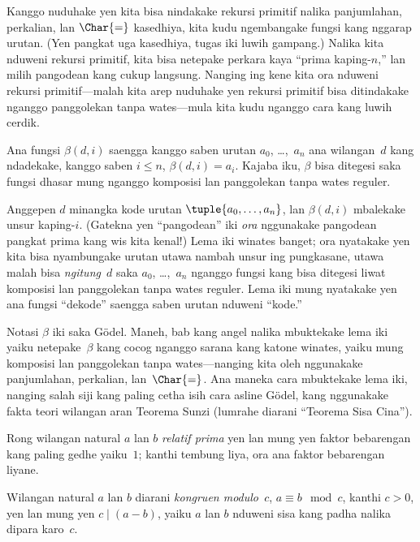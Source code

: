 \documentclass[../../../include/open-logic-section]{subfiles}
\begin{document}


Kanggo nuduhake yen kita bisa nindakake rekursi primitif nalika
panjumlahan, perkalian, lan $\Char{=}$ kasedhiya, kita kudu
ngembangake fungsi kang nggarap urutan. (Yen pangkat uga
kasedhiya, tugas iki luwih gampang.) Nalika kita nduweni rekursi
primitif, kita bisa netepake perkara kaya ``prima kaping-$n$,'' lan
milih pangodean kang cukup langsung. Nanging ing kene kita ora
nduweni rekursi primitif---malah kita arep nuduhake yen rekursi
primitif bisa ditindakake nganggo panggolekan tanpa wates---mula kita kudu
nganggo cara kang luwih cerdik.

\begin{lem}
Ana fungsi $\beta(d,i)$ saengga kanggo saben urutan $a_0$,
\dots,~$a_n$ ana wilangan~$d$ kang ndadekake, kanggo saben $i \le n$,
$\beta(d,i) = a_i$. Kajaba iku, $\beta$ bisa ditegesi saka fungsi
dhasar mung nganggo komposisi lan panggolekan tanpa wates reguler.
\end{lem}

Anggepen $d$ minangka kode urutan $\tuple{a_0, \dots, a_n}$, lan
$\beta(d,i)$ mbalekake unsur kaping-$i$. (Gatekna yen ``pangodean'' iki
\emph{ora} nggunakake pangodean pangkat prima kang wis kita kenal!)
Lema iki winates banget; ora nyatakake yen kita bisa nyambungake
urutan utawa nambah unsur ing pungkasane, utawa malah bisa
\emph{ngitung}~$d$ saka $a_0$, \dots,~$a_n$ nganggo fungsi kang bisa
ditegesi liwat komposisi lan panggolekan tanpa wates reguler. Lema
iki mung nyatakake yen ana fungsi ``dekode'' saengga saben urutan
nduweni ``kode.''

Notasi $\beta$ iki saka G\"odel. Maneh, bab kang angel nalika mbuktekake
lema iki yaiku netepake~$\beta$ kang cocog nganggo sarana kang katone
winates, yaiku mung komposisi lan panggolekan tanpa wates---nanging kita oleh
nggunakake panjumlahan, perkalian, lan~$\Char{=}$. Ana maneka cara
mbuktekake lema iki, nanging salah siji kang paling cetha isih cara
asline G\"odel, kang nggunakake fakta teori wilangan aran Teorema
Sunzi (lumrahe diarani ``Teorema Sisa Cina'').

\begin{defn}
Rong wilangan natural $a$ lan $b$ \emph{relatif prima} yen lan mung yen
faktor bebarengan kang paling gedhe yaiku~$1$; kanthi tembung liya,
ora ana faktor bebarengan liyane.
\end{defn}

\begin{defn}
Wilangan natural $a$ lan $b$ diarani \emph{kongruen modulo~$c$},
$a \equiv b \mod c$, kanthi $c>0$, yen lan mung yen $c \mid (a-b)$, yaiku $a$ lan $b$
nduweni sisa kang padha nalika dipara karo~$c$.
\end{defn}
\end{document}
